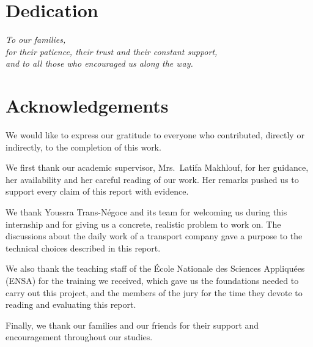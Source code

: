 \setcounter{page}{1}

\chapter*{Dedication}
\begin{center}
\vspace*{4cm}
\itshape
To our families,\\
for their patience, their trust and their constant support,\\[0.6em]
and to all those who encouraged us along the way.
\end{center}
\clearpage

\chapter*{Acknowledgements}
We would like to express our gratitude to everyone who contributed, directly or indirectly, to the completion of this work.

We first thank our academic supervisor, Mrs.\ Latifa Makhlouf, for her guidance, her availability and her careful reading of our work. Her remarks pushed us to support every claim of this report with evidence.

We thank Youssra Trans-N\'egoce and its team for welcoming us during this internship and for giving us a concrete, realistic problem to work on. The discussions about the daily work of a transport company gave a purpose to the technical choices described in this report.

We also thank the teaching staff of the \'Ecole Nationale des Sciences Appliqu\'ees (ENSA) for the training we received, which gave us the foundations needed to carry out this project, and the members of the jury for the time they devote to reading and evaluating this report.

Finally, we thank our families and our friends for their support and encouragement throughout our studies.
\clearpage

